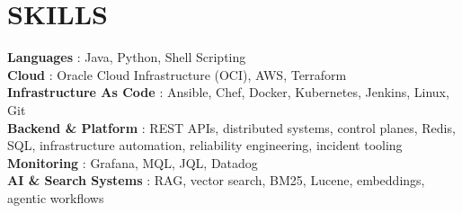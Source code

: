 \documentclass[letterpaper,11pt]{article}
\begin{document}
\section{SKILLS}
\begin{itemize}[leftmargin=0in, label={}]
    \small{\item{
     \textbf{Languages} {: Java, Python, Shell Scripting} \\
     \textbf{Cloud} {: Oracle Cloud Infrastructure (OCI), AWS, Terraform} \\
     \textbf{Infrastructure As Code} {: Ansible, Chef, Docker, Kubernetes, Jenkins, Linux, Git} \\
     \textbf{Backend \& Platform} {: REST APIs, distributed systems, control planes, Redis, SQL, infrastructure automation, reliability engineering, incident tooling} \\
     \textbf{Monitoring} {: Grafana, MQL, JQL, Datadog} \\
     \textbf{AI \& Search Systems} {: RAG, vector search, BM25, Lucene, embeddings, agentic workflows}
    }}
\end{itemize}

\end{document}
